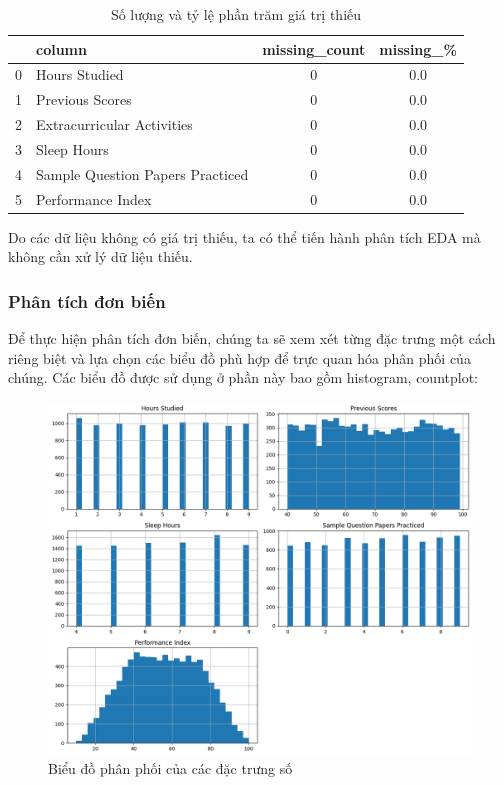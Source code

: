 \begin{table}[H]
	\centering
	\begin{tabular}{|c|l|c|c|}
		\hline
		\textbf{} & \textbf{column}                  & \textbf{missing\_count} & \textbf{missing\_\%} \\ \hline
		0         & Hours Studied                    & 0                       & 0.0                  \\
		1         & Previous Scores                  & 0                       & 0.0                  \\
		2         & Extracurricular Activities       & 0                       & 0.0                  \\
		3         & Sleep Hours                      & 0                       & 0.0                  \\
		4         & Sample Question Papers Practiced & 0                       & 0.0                  \\
		5         & Performance Index                & 0                       & 0.0                  \\ \hline
	\end{tabular}
	\caption{Số lượng và tỷ lệ phần trăm giá trị thiếu}
\end{table}

Do các dữ liệu không có giá trị thiếu, ta có thể tiến hành phân tích EDA mà không cần xử lý dữ liệu thiếu.

\subsubsection{Phân tích đơn biến}
Để thực hiện phân tích đơn biến, chúng ta sẽ xem xét từng đặc trưng một cách riêng biệt và lựa chọn các biểu đồ phù hợp để trực quan hóa phân phối của chúng. Các biểu đồ được sử dụng ở phần này bao gồm histogram, countplot:

\begin{figure}[H]
	\centering
	\includegraphics[width=\textwidth]{images/eda/1.png}
	\caption{Biểu đồ phân phối của các đặc trưng số}
\end{figure}

